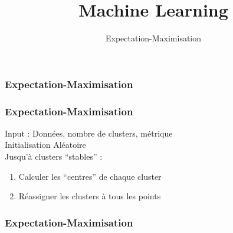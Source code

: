 \documentclass{formation}
\title{Machine Learning}
\subtitle{Expectation-Maximisation}
\begin{document}
\maketitle


\begin{frame}
  \frametitle{Expectation-Maximisation}
\end{frame}

\begin{frame}
  \frametitle{Expectation-Maximisation}
  Input : Données, nombre de clusters, métrique \\
  Initialisation Aléatoire \\
  Jusqu'à clusters ``stables'' :\\
  \begin{enumerate}
  \item Calculer les ``centres'' de chaque cluster
  \item Réassigner les clusters à tous les points
  \end{enumerate}
\end{frame}

\begin{frame}
  \frametitle{Expectation-Maximisation}
\end{frame}
\end{document}
